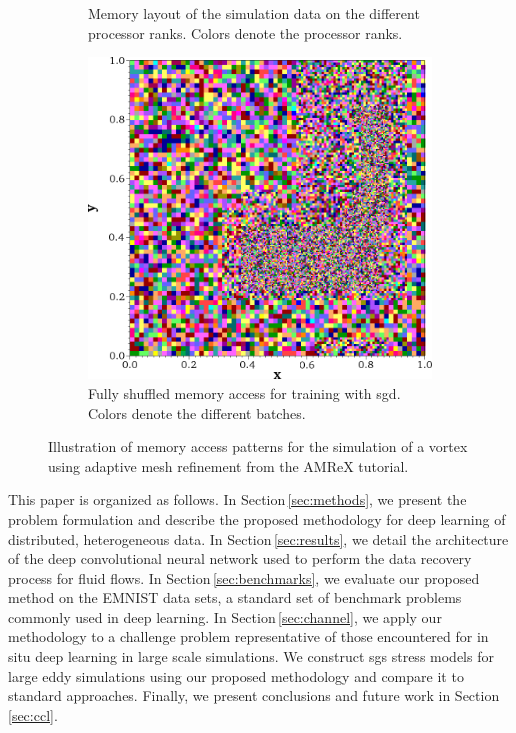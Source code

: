 \documentclass[review]{elsarticle}
\begin{document}
\begin{figure}[!tbp]
\begin{subfigure}[t]{0.32\textwidth}
    \caption{Memory layout of the simulation data on the different processor ranks. Colors denote the processor ranks.}\label{fig:proc_access}%
  \end{subfigure}\hfill%
  \begin{subfigure}[t]{0.32\textwidth}%
    \includegraphics[width=\textwidth]{./figs/shuffled_access.png}%
    \caption{Fully shuffled memory access for training with \gls{sgd}. Colors denote the different batches.}\label{fig:shuffled_access}%
  \end{subfigure}%
  \caption{Illustration of memory access patterns for the simulation of a vortex using adaptive mesh refinement from the AMReX tutorial.}\label{fig:access_patterns}%
\end{figure}%

This paper is organized as follows. In Section\,\ref{sec:methods}, we
present the problem formulation and describe the proposed methodology
for deep learning of distributed, heterogeneous data. In
Section\,\ref{sec:results}, we detail the architecture of the deep
convolutional neural network used to perform the data recovery process
for fluid flows. In Section\,\ref{sec:benchmarks}, we evaluate our
proposed method on the EMNIST data sets, a standard set of benchmark
problems commonly used in deep learning. In
Section\,\ref{sec:channel}, we apply our methodology to a challenge
problem representative of those encountered for in situ deep learning
in large scale simulations. We construct \gls{sgs} stress models for
large eddy simulations using our proposed methodology and compare it
to standard approaches. Finally, we present conclusions and future work
in Section\,\ref{sec:ccl}.
\end{document}
